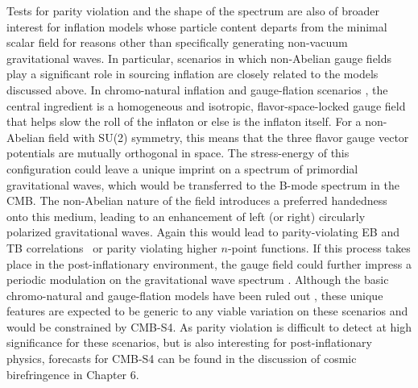 Tests for parity violation and the shape of the spectrum are also of broader interest for inflation models whose particle content departs from the minimal scalar field for reasons other than specifically generating non-vacuum gravitational waves. In particular, scenarios in which non-Abelian gauge fields play a significant role in sourcing inflation are closely related to the models discussed above. In chromo-natural inflation and gauge-flation scenarios \cite{Maleknejad:2011jw,Adshead:2012kp,Adshead:2012qe,Adshead:2013qp,Adshead:2013nka,Dimastrogiovanni:2012st,Dimastrogiovanni:2012ew}, the central ingredient is a homogeneous and isotropic, flavor-space-locked gauge field that helps slow the roll of the inflaton or else is the inflaton itself. For a non-Abelian field with SU(2) symmetry, this means that the three flavor gauge vector potentials are mutually orthogonal in space. The stress-energy of this configuration could leave a unique imprint on a spectrum of primordial gravitational waves, which would be transferred to the B-mode spectrum in the CMB. The non-Abelian nature of the field introduces a preferred handedness onto this medium, leading to an enhancement of left (or right) circularly polarized gravitational waves. Again this would lead to parity-violating EB and TB correlations~\cite{Lue:1998mq,Gluscevic:2010vv} or parity violating higher $n$-point functions. If this process takes place in the post-inflationary environment, the gauge field could further impress a periodic modulation on the gravitational wave spectrum \cite{Bielefeld:2014nza,Bielefeld:2015daa}. Although the basic chromo-natural and gauge-flation models have been ruled out \cite{Namba:2013kia}, these unique features are expected to be generic to any viable variation on these scenarios and would be constrained by CMB-S4. 
As parity violation is difficult to detect at high significance for these scenarios, but is also interesting for post-inflationary physics, forecasts for CMB-S4 can be found in the discussion of cosmic birefringence in Chapter 6.


